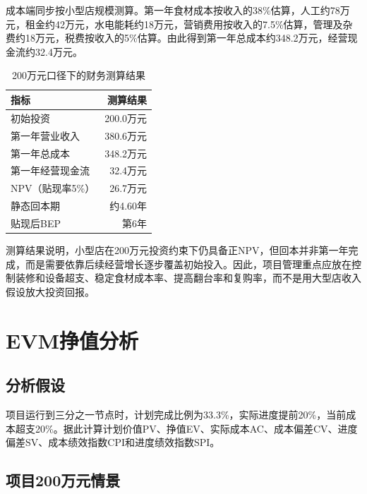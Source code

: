 \documentclass[UTF8,zihao=-4]{ctexart}
\begin{document}
成本端同步按小型店规模测算。第一年食材成本按收入的38\%估算，人工约78万元，租金约42万元，水电能耗约18万元，营销费用按收入的7.5\%估算，管理及杂费约18万元，税费按收入的5\%估算。由此得到第一年总成本约348.2万元，经营现金流约32.4万元。

\begin{table}[H]
  \centering
  \caption{200万元口径下的财务测算结果}
  \begin{tabular}{lr}
    \toprule
    指标 & 测算结果 \\
    \midrule
    初始投资 & 200.0万元 \\
    第一年营业收入 & 380.6万元 \\
    第一年总成本 & 348.2万元 \\
    第一年经营现金流 & 32.4万元 \\
    NPV（贴现率5\%） & 26.7万元 \\
    静态回本期 & 约4.60年 \\
    贴现后BEP & 第6年 \\
    \bottomrule
  \end{tabular}
\end{table}

测算结果说明，小型店在200万元投资约束下仍具备正NPV，但回本并非第一年完成，而是需要依靠后续经营增长逐步覆盖初始投入。因此，项目管理重点应放在控制装修和设备超支、稳定食材成本率、提高翻台率和复购率，而不是用大型店收入假设放大投资回报。

\section{EVM挣值分析}

\subsection{分析假设}

项目运行到三分之一节点时，计划完成比例为33.3\%，实际进度提前20\%，当前成本超支20\%。据此计算计划价值PV、挣值EV、实际成本AC、成本偏差CV、进度偏差SV、成本绩效指数CPI和进度绩效指数SPI。

\subsection{项目200万元情景}
\end{document}
